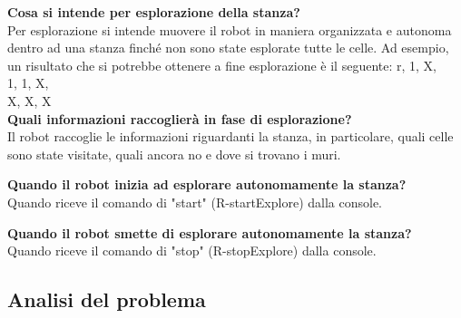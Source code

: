 \textbf{Cosa si intende per esplorazione della stanza?}\\
Per esplorazione si intende muovere il robot in maniera organizzata e autonoma dentro ad una stanza finché non sono state esplorate tutte le celle. Ad esempio, un risultato che si potrebbe ottenere a fine esplorazione è il seguente:\newline   
r, 1, X,\\
1, 1, X,\\
X, X, X\\

\textbf{Quali informazioni raccoglierà in fase di esplorazione?}\\
Il robot raccoglie le informazioni riguardanti la stanza, in particolare, quali celle sono state visitate, quali ancora no e dove si trovano i muri.

\textbf{Quando il robot inizia ad esplorare autonomamente la stanza?}\\
Quando riceve il comando di "start" (R-startExplore) dalla console.

\textbf{Quando il robot smette di esplorare autonomamente la stanza?}\\
Quando riceve il comando di "stop" (R-stopExplore) dalla console.


\subsection{Analisi del problema}


